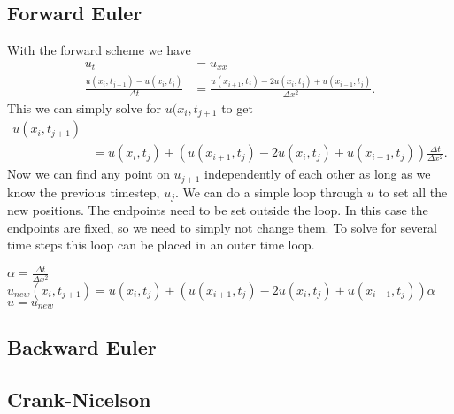 \subsection{Forward Euler}

With the forward scheme we have
\begin{align*}
    u_t &= u_{xx} \\
    \frac{u(x_i, t_{j+1}) - u(x_i, t_j)}{\Delta t}
    &= \frac{u(x_{i+1}, t_j) - 2u(x_i, t_j) + u(x_{i-1}, t_j)}{\Delta x^2}.
\end{align*}
This we can simply solve for $u(x_i, t_{j+1}$ to get
\begin{align*}
    u(x_i, t_{j+1}) \\
    &= u(x_i, t_j)
    +  \left( u(x_{i+1}, t_j) - 2u(x_i, t_j) + u(x_{i-1}, t_j) \right)
       \frac{\Delta t}{\Delta x^2}.
\end{align*}
Now we can find any point on $u_{j+1}$ independently of each other
as long as we know the previous timestep, $u_j$. We can do a simple
loop through $u$ to set all the new positions. The endpoints need
to be set outside the loop. In this case the endpoints are fixed,
so we need to simply not change them. To solve for several time
steps this loop can be placed in an outer time loop.
\begin{algorithmic}
    \State $ \alpha = \frac{\Delta t}{\Delta x^2} $
            \State $ u_{new}(x_i, t_{j+1})
            = u(x_i, t_j)
            + \left(
              u(x_{i+1}, t_j) - 2u(x_i, t_j) + u(x_{i-1}, t_j)
              \right) \alpha $
        \EndFor
        \State $ u = u_{new} $
    \EndFor
\end{algorithmic}


\subsection{Backward Euler}


\subsection{Crank-Nicelson}
